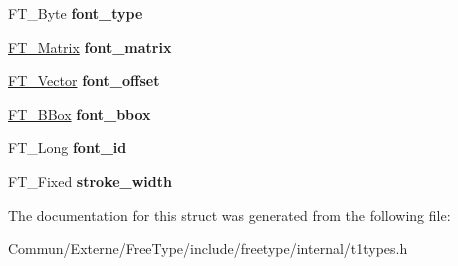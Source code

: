 \begin{DoxyCompactItemize}
\item 
F\+T\+\_\+\+Byte {\bfseries font\+\_\+type}\hypertarget{struct_t1___font_rec___a9d37e54d3a584f823dca80eca624f700}{}\label{struct_t1___font_rec___a9d37e54d3a584f823dca80eca624f700}

\item 
\hyperlink{struct_f_t___matrix__}{F\+T\+\_\+\+Matrix} {\bfseries font\+\_\+matrix}\hypertarget{struct_t1___font_rec___a87c95f084851d2bb9e48889e9444b2a8}{}\label{struct_t1___font_rec___a87c95f084851d2bb9e48889e9444b2a8}

\item 
\hyperlink{struct_f_t___vector__}{F\+T\+\_\+\+Vector} {\bfseries font\+\_\+offset}\hypertarget{struct_t1___font_rec___ab6e773e20df1c585dc14ee3fa7ed1737}{}\label{struct_t1___font_rec___ab6e773e20df1c585dc14ee3fa7ed1737}

\item 
\hyperlink{struct_f_t___b_box__}{F\+T\+\_\+\+B\+Box} {\bfseries font\+\_\+bbox}\hypertarget{struct_t1___font_rec___a86fd1af4c03e34b7d151054ccc7525a7}{}\label{struct_t1___font_rec___a86fd1af4c03e34b7d151054ccc7525a7}

\item 
F\+T\+\_\+\+Long {\bfseries font\+\_\+id}\hypertarget{struct_t1___font_rec___a14178cf438d1a5fcb31b7d398d06cfaf}{}\label{struct_t1___font_rec___a14178cf438d1a5fcb31b7d398d06cfaf}

\item 
F\+T\+\_\+\+Fixed {\bfseries stroke\+\_\+width}\hypertarget{struct_t1___font_rec___ac71ace1872be6b2adbd3d6f5ca456d23}{}\label{struct_t1___font_rec___ac71ace1872be6b2adbd3d6f5ca456d23}

\end{DoxyCompactItemize}


The documentation for this struct was generated from the following file\+:\begin{DoxyCompactItemize}
\item 
Commun/\+Externe/\+Free\+Type/include/freetype/internal/t1types.\+h\end{DoxyCompactItemize}
